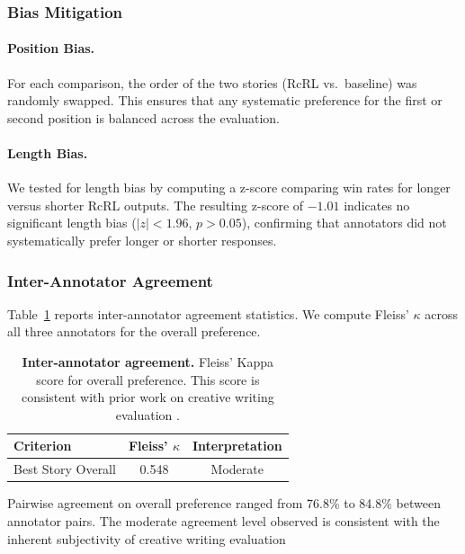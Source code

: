 \documentclass{article}
\theoremstyle{plain}
\theoremstyle{definition}
\theoremstyle{remark}
\begin{document}
\subsubsection{Bias Mitigation}

\paragraph{Position Bias.} For each comparison, the order of the two stories (RcRL vs.\ baseline) was randomly swapped. This ensures that any systematic preference for the first or second position is balanced across the evaluation.

\paragraph{Length Bias.} We tested for length bias by computing a z-score comparing win rates for longer versus shorter RcRL outputs. The resulting z-score of $-1.01$ indicates no significant length bias ($|z| < 1.96$, $p > 0.05$), confirming that annotators did not systematically prefer longer or shorter responses.

\subsubsection{Inter-Annotator Agreement}

Table~\ref{tab:annotator-agreement} reports inter-annotator agreement statistics. We compute Fleiss' $\kappa$ across all three annotators for the overall preference.

\begin{table}[h]
\centering
\small
\caption{\textbf{Inter-annotator agreement.} Fleiss' Kappa score for overall preference. This score is consistent with prior work on creative writing evaluation \citep{gomez-rodriguez-williams-2023-confederacy}.}
\begin{tabular}{lcc}
\toprule
\textbf{Criterion} & \textbf{Fleiss' $\kappa$} & \textbf{Interpretation} \\
\midrule
Best Story Overall & 0.548 & Moderate \\
\bottomrule
\end{tabular}
\vspace{8pt}
\label{tab:annotator-agreement}
\end{table}

Pairwise agreement on overall preference ranged from 76.8\% to 84.8\% between annotator pairs. The moderate agreement level observed is consistent with the inherent subjectivity of creative writing evaluation
\end{document}

